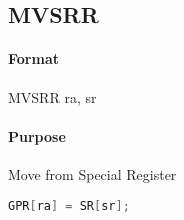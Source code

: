 \subsection{MVSRR}


\paragraph{Format} MVSRR ra, sr

\paragraph{Purpose} Move from Special Register

\begin{lstlisting}[language=C]
    GPR[ra] = SR[sr];
\end{lstlisting}
